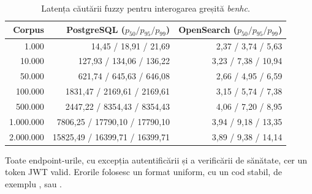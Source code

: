 \begin{table}[!htb]
  \centering
  \small
  \begin{tabular}{@{}rrr@{}}
  \toprule
  Corpus & PostgreSQL ($p_{50}/p_{95}/p_{99}$) & OpenSearch ($p_{50}/p_{95}/p_{99}$) \\
  \midrule
  1.000     & 14,45 / 18,91 / 21,69          & 2,37 / 3,74 / 5,63 \\
  10.000    & 127,93 / 134,06 / 136,22       & 3,23 / 7,38 / 10,94 \\
  50.000    & 621,74 / 645,63 / 646,08       & 2,66 / 4,95 / 6,59 \\
  100.000   & 1831,47 / 2169,61 / 2169,61    & 3,15 / 5,74 / 7,38 \\
  500.000   & 2447,22 / 8354,43 / 8354,43    & 4,06 / 7,20 / 8,95 \\
  1.000.000 & 7806,25 / 17790,10 / 17790,10  & 3,94 / 9,18 / 13,35 \\
  2.000.000 & 15825,49 / 16399,71 / 16399,71 & 3,89 / 9,38 / 14,14 \\
  \bottomrule
  \end{tabular}
  \caption{Latența căutării fuzzy pentru interogarea greșită \emph{benhc}.}
\end{table}


Toate endpoint-urile, cu excepția autentificării și a verificării de sănătate, cer un token JWT valid.
Erorile folosesc un format uniform, cu un cod stabil, de exemplu ,
 sau .

